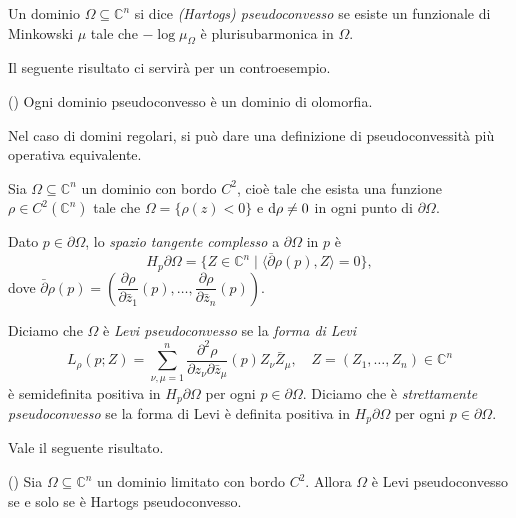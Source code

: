 \begin{defn}
    Un dominio $\Omega \subseteq \mathbb{C}^n$ si dice \textit{(Hartogs) pseudoconvesso} se esiste un funzionale di Minkowski $\mu$ tale che $-\log\mu_{\Omega}$ è plurisubarmonica in $\Omega$.
\end{defn}

 Il seguente risultato ci servirà per un controesempio.

 \begin{thm}
    (\cite[Theorem 5.1.2]{Kr}) Ogni dominio pseudoconvesso è un dominio di olomorfia.
 \end{thm}

Nel caso di domini regolari, si può dare una definizione di pseudoconvessità più operativa equivalente.

\begin{defn}
    Sia $\Omega \subseteq \mathbb{C}^n$ un dominio con bordo $C^2$, cioè tale che esista una funzione $\rho \in C^2(\mathbb{C}^n)$ tale che $\Omega=\{\rho(z)<0\}$ e $\mathop{}\!\mathrm{d}\rho\not=0$ in ogni punto di $\partial\Omega$.
    
    Dato $p \in \partial\Omega$, lo \textit{spazio tangente complesso} a $\partial\Omega$ in $p$ è
    $$H_p\partial\Omega=\{Z \in \mathbb{C}^n \mid \langle \bar{\partial}\rho(p),Z\rangle=0\},$$
    dove $\bar{\partial}\rho(p)=\left(\dfrac{\partial\rho}{\partial\bar{z}_1}(p),\dots,\dfrac{\partial\rho}{\partial\bar{z}_n}(p)\right)$.

    Diciamo che $\Omega$ è \textit{Levi pseudoconvesso} se la \textit{forma di Levi}
    $$L_{\rho}(p;Z)=\sum_{\nu,\mu=1}^n \frac{\partial^2\rho}{\partial z_\nu\partial\bar{z}_\mu}(p)Z_\nu\bar{Z}_\mu, \quad Z=(Z_1,\dots,Z_n) \in \mathbb{C}^n$$
      è semidefinita positiva in $H_p\partial\Omega$ per ogni $p \in \partial\Omega$. Diciamo che è \textit{strettamente pseudoconvesso} se la forma di Levi è definita positiva in $H_p\partial\Omega$ per ogni $p \in \partial\Omega$.
\end{defn}

Vale il seguente risultato.
\begin{thm}
    (\cite[Theorem 3.3.5]{Kr}) Sia $\Omega \subseteq \mathbb{C}^n$ un dominio limitato con bordo $C^2$. Allora $\Omega$ è Levi pseudoconvesso se e solo se è Hartogs pseudoconvesso.
\end{thm}